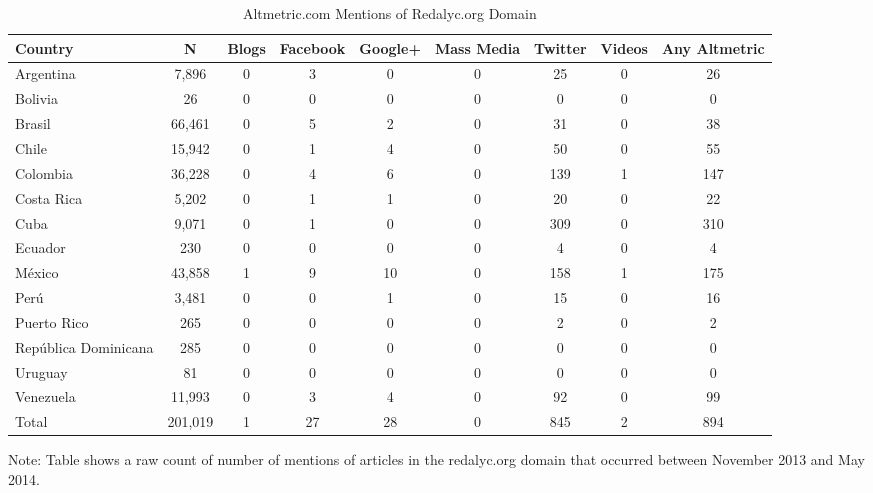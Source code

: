 \begin{table}
\centering
\begin{threeparttable}
\caption{Altmetric.com Mentions of Redalyc.org Domain} \label{altmetric_raw_counts_Nov2013_May2014_redalyc}
\begin{tabular}{@{}lcccccccc@{}}
\toprule
Country &   N   &   Blogs   &   Facebook    &   Google+ &   Mass Media  &   Twitter &   Videos  &   Any Altmetric   \\ \midrule
Argentina   &   7,896    &   0   &   3   &   0   &   0   &   25  &   0   &   26  \\
Bolivia &   26  &   0   &   0   &   0   &   0   &   0   &   0   &   0   \\
Brasil  &   66,461   &   0   &   5   &   2   &   0   &   31  &   0   &   38  \\
Chile   &   15,942   &   0   &   1   &   4   &   0   &   50  &   0   &   55  \\
Colombia    &   36,228   &   0   &   4   &   6   &   0   &   139 &   1   &   147 \\
Costa Rica  &   5,202    &   0   &   1   &   1   &   0   &   20  &   0   &   22  \\
Cuba    &   9,071    &   0   &   1   &   0   &   0   &   309 &   0   &   310 \\
Ecuador &   230 &   0   &   0   &   0   &   0   &   4   &   0   &   4   \\
México &   43,858   &   1   &   9   &   10  &   0   &   158 &   1   &   175 \\
Perú   &   3,481    &   0   &   0   &   1   &   0   &   15  &   0   &   16  \\
Puerto Rico &   265 &   0   &   0   &   0   &   0   &   2   &   0   &   2   \\
República Dominicana   &   285 &   0   &   0   &   0   &   0   &   0   &   0   &   0   \\
Uruguay &   81  &   0   &   0   &   0   &   0   &   0   &   0   &   0   \\
Venezuela   &   11,993   &   0   &   3   &   4   &   0   &   92  &   0   &   99  \\ \midrule
Total   &   201,019  &   1   &   27  &   28  &   0   &   845 &   2   &   894 \\ \bottomrule
\end{tabular}
\begin{tablenotes}
\small
\item Note: Table shows a raw count of number of mentions of articles in the redalyc.org domain that occurred between November 2013 and May 2014.
\end{tablenotes}
\end{threeparttable}
\end{table}

